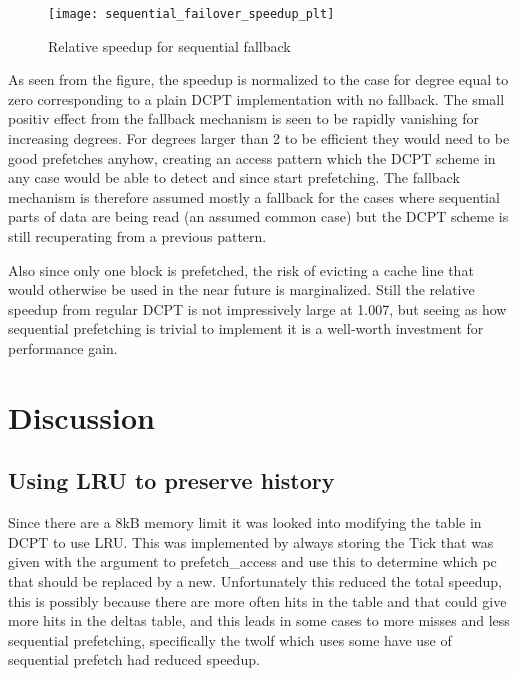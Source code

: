 \documentclass[12pt,journal,compsoc]{IEEEtran}
\begin{document}
\begin{figure}
\begin{center}
\texttt{[image: sequential\_failover\_speedup\_plt]}
\end{center}
\caption{\label{fig:fallback} Relative speedup for sequential fallback}
\end{figure}

As seen from the figure, the speedup is normalized to the case for degree equal
to zero corresponding to a plain DCPT implementation with no fallback. The
small positiv effect from the fallback mechanism is seen to be rapidly
vanishing for increasing degrees. For degrees larger than 2 to be efficient
they would need to be good prefetches anyhow, creating an access pattern which
the DCPT scheme in any case would be able to detect and since start
prefetching. The fallback mechanism is therefore assumed mostly a fallback for
the cases where sequential parts of data are being read
(an assumed common case) but the DCPT scheme is still recuperating from a
previous pattern.

Also since only one block is prefetched, the risk of evicting a cache line
that would otherwise be used in the near future is marginalized. Still the
relative speedup from regular DCPT is not impressively large at 1.007, but
seeing as how sequential prefetching is trivial to implement it is a
well-worth investment for performance gain.

\section{Discussion}
\subsection{Using LRU to preserve history}
Since there are a 8kB memory limit it was looked into modifying the table in DCPT to use LRU. This was implemented by always storing the Tick that was given with the argument to prefetch\_access and use this to determine which pc that should be replaced by a new. Unfortunately this reduced the total speedup, this is possibly because there are more often hits in the table and that could give more hits in the deltas table, and this leads in some cases to more misses and less sequential prefetching, specifically the twolf which uses some have use of sequential prefetch had reduced speedup.
\end{document}
